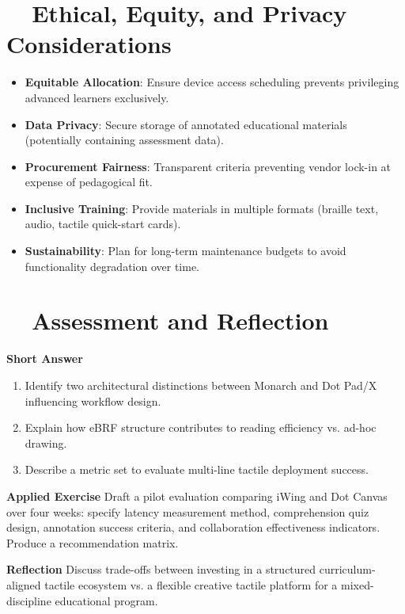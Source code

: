 \section{~~Ethical, Equity, and Privacy Considerations}
\label{sec:sr29-ethics}
\begin{itemize}
	\item \textbf{Equitable Allocation}: Ensure device access scheduling prevents privileging advanced learners exclusively.
	\item \textbf{Data Privacy}: Secure storage of annotated educational materials (potentially containing assessment data).
	\item \textbf{Procurement Fairness}: Transparent criteria preventing vendor lock-in at expense of pedagogical fit.
	\item \textbf{Inclusive Training}: Provide materials in multiple formats (braille text, audio, tactile quick-start cards).
	\item \textbf{Sustainability}: Plan for long-term maintenance budgets to avoid functionality degradation over time.
\end{itemize}

\section{~~Assessment and Reflection}
\label{sec:sr29-assessment}
\textbf{Short Answer}
\begin{enumerate}
	\item Identify two architectural distinctions between Monarch and Dot Pad/X influencing workflow design.
	\item Explain how eBRF structure contributes to reading efficiency vs. ad-hoc drawing.
	\item Describe a metric set to evaluate multi-line tactile deployment success.
\end{enumerate}

\textbf{Applied Exercise} Draft a pilot evaluation comparing iWing and Dot Canvas over four weeks: specify latency measurement method, comprehension quiz design, annotation success criteria, and collaboration effectiveness indicators. Produce a recommendation matrix.

\textbf{Reflection} Discuss trade-offs between investing in a structured curriculum-aligned tactile ecosystem vs. a flexible creative tactile platform for a mixed-discipline educational program.

